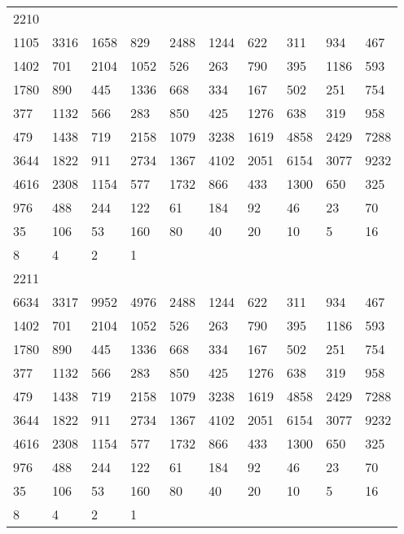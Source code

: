 \begin{longtable}{*{10}{l}}
2210&&&&&&&&&\\
1105& 3316& 1658& 829& 2488& 1244& 622& 311& 934& 467\\
1402& 701& 2104& 1052& 526& 263& 790& 395& 1186& 593\\
1780& 890& 445& 1336& 668& 334& 167& 502& 251& 754\\
377& 1132& 566& 283& 850& 425& 1276& 638& 319& 958\\
479& 1438& 719& 2158& 1079& 3238& 1619& 4858& 2429& 7288\\
3644& 1822& 911& 2734& 1367& 4102& 2051& 6154& 3077& 9232\\
4616& 2308& 1154& 577& 1732& 866& 433& 1300& 650& 325\\
976& 488& 244& 122& 61& 184& 92& 46& 23& 70\\
35& 106& 53& 160& 80& 40& 20& 10& 5& 16\\
8& 4& 2& 1& \\

2211&&&&&&&&&\\
6634& 3317& 9952& 4976& 2488& 1244& 622& 311& 934& 467\\
1402& 701& 2104& 1052& 526& 263& 790& 395& 1186& 593\\
1780& 890& 445& 1336& 668& 334& 167& 502& 251& 754\\
377& 1132& 566& 283& 850& 425& 1276& 638& 319& 958\\
479& 1438& 719& 2158& 1079& 3238& 1619& 4858& 2429& 7288\\
3644& 1822& 911& 2734& 1367& 4102& 2051& 6154& 3077& 9232\\
4616& 2308& 1154& 577& 1732& 866& 433& 1300& 650& 325\\
976& 488& 244& 122& 61& 184& 92& 46& 23& 70\\
35& 106& 53& 160& 80& 40& 20& 10& 5& 16\\
8& 4& 2& 1& \\


\end{longtable}
